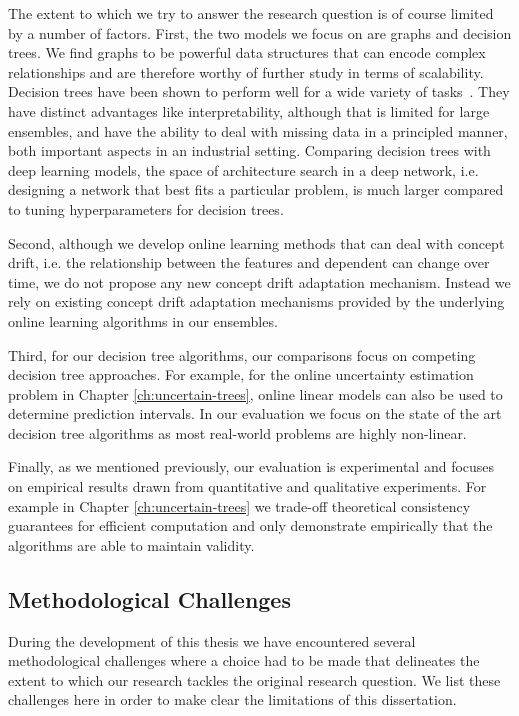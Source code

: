 The extent to which we try to answer the research question is of course limited by
a number of factors. First, the two models we focus on are graphs and decision
trees. We find graphs to be powerful data structures that can encode complex
relationships and are therefore worthy of further study in terms of scalability.
Decision trees have been shown to perform well for a wide variety of tasks~\cite{hundreds-classifiers}.
They have distinct advantages like interpretability, although that is limited
for large ensembles, and have the ability to deal with missing data in a principled
manner, both important aspects in an industrial setting.
Comparing decision trees with deep learning models, the space
of architecture search in a deep network, i.e. designing a network that best fits
a particular problem, is much larger compared to tuning hyperparameters for
decision trees.

Second, although we develop online learning methods that can deal
with concept drift, i.e. the relationship between the features and dependent
can change over time, we do not propose any new concept drift adaptation
mechanism. Instead we rely on existing concept drift adaptation mechanisms
provided by the underlying online learning algorithms in our ensembles.

Third, for our decision tree algorithms, our comparisons focus on
competing decision tree approaches. For example, for the online uncertainty
estimation problem in Chapter \ref{ch:uncertain-trees}, online linear
models can also be used to determine prediction intervals. In our evaluation
we focus on the state of the art decision tree algorithms as
most real-world problems are highly non-linear.

Finally, as we mentioned previously, our evaluation is experimental
and focuses on empirical results drawn from quantitative and qualitative
experiments. For example in Chapter \ref{ch:uncertain-trees} we trade-off
theoretical consistency guarantees for efficient computation
and only demonstrate empirically that the algorithms are able to maintain validity.

\subsection{Methodological Challenges}

During the development of this thesis we have encountered several methodological
challenges where a choice had to be made that delineates the extent to which
our research tackles the original research question. We list these challenges
here in order to make clear the limitations of this dissertation.

